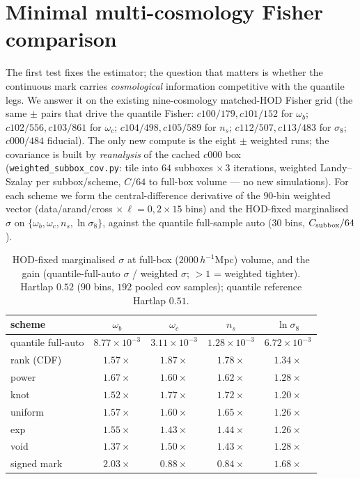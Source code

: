\documentclass[11pt]{article}
\newcommand{\code}[1]{\texttt{#1}}
\begin{document}
\section{Minimal multi-cosmology Fisher comparison}
The first test fixes the estimator; the question that matters is whether the
continuous mark carries \emph{cosmological} information competitive with the
quantile legs.  We answer it on the existing nine-cosmology matched-HOD Fisher
grid (the same $\pm$ pairs that drive the quantile Fisher: $c100/179,c101/152$ for
$\omega_b$; $c102/556,c103/861$ for $\omega_c$; $c104/498,c105/589$ for $n_s$;
$c112/507,c113/483$ for $\sigma_8$; $c000/484$ fiducial).  The only new compute is
the eight $\pm$ weighted runs; the covariance is built by \emph{reanalysis} of the
cached $c000$ box (\code{weighted\_subbox\_cov.py}: tile into $64$ subboxes
$\times\,3$ iterations, weighted Landy--Szalay per subbox/scheme, $C/64$ to
full-box volume --- no new simulations).  For each scheme we form the
central-difference derivative of the $90$-bin weighted vector
(data/arand/cross $\times\,\ell{=}0,2\times15$ bins) and the HOD-fixed marginalised
$\sigma$ on $\{\omega_b,\omega_c,n_s,\ln\sigma_8\}$, against the quantile
full-sample auto ($30$ bins, $C_{\rm subbox}/64$).

\begin{table}[h]
  \centering
  \caption{HOD-fixed marginalised $\sigma$ at full-box ($2000\,h^{-1}$Mpc) volume,
  and the gain (quantile-full-auto $\sigma$ / weighted $\sigma$; $>\!1$ = weighted
  tighter).  Hartlap $0.52$ ($90$ bins, $192$ pooled cov samples); quantile
  reference Hartlap $0.51$.}
  \begin{tabular}{lcccc}
    \hline
    scheme & $\omega_b$ & $\omega_c$ & $n_s$ & $\ln\sigma_8$ \\
    \hline
    quantile full-auto & $8.77\!\times\!10^{-3}$ & $3.11\!\times\!10^{-3}$ & $1.28\!\times\!10^{-3}$ & $6.72\!\times\!10^{-3}$ \\
    \hline
    rank (CDF)  & $1.57\times$ & $\mathbf{1.87\times}$ & $\mathbf{1.78\times}$ & $1.34\times$ \\
    power       & $\mathbf{1.67\times}$ & $1.60\times$ & $1.62\times$ & $1.28\times$ \\
    knot        & $1.52\times$ & $1.77\times$ & $1.72\times$ & $1.20\times$ \\
    uniform     & $1.57\times$ & $1.60\times$ & $1.65\times$ & $1.26\times$ \\
    exp         & $1.55\times$ & $1.43\times$ & $1.44\times$ & $1.26\times$ \\
    void        & $1.37\times$ & $1.50\times$ & $1.43\times$ & $1.28\times$ \\
    signed mark & $\mathbf{2.03\times}$ & $0.88\times$ & $0.84\times$ & $\mathbf{1.68\times}$ \\
    \hline
  \end{tabular}
  \label{tab:fisher}
\end{table}
\end{document}
